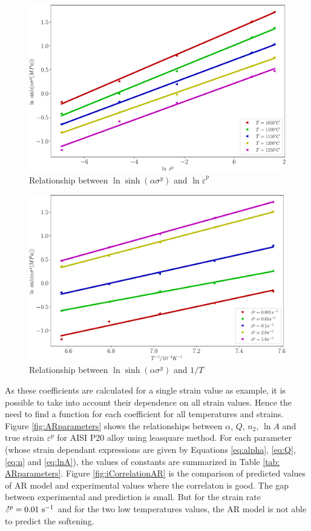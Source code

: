 \documentclass[twoside,english,1p,final,sort&compress]{elsarticle}
\theoremstyle{plain}
\newcommand{\mdot}[1]{\accentset{\mbox{\bfseries .}}{#1}}
\begin{document}
\begin{figure}[!ht]
\centering
\includegraphics[width=0.9\columnwidth]{Figures/LnSinhE}
\caption{Relationship between $\ln \sinh(\alpha\sigma^y) $ and $\ln \dot{\varepsilon}^p$}
\label{fig:LnSinhE}
\end{figure}
\begin{figure}[!ht]
\centering
\includegraphics[width=0.9\columnwidth]{Figures/LnSinhT}
\caption{Relationship between $\ln \sinh(\alpha\sigma^y) $ and $1/T$}
\label{fig:LnSinhT}
\end{figure}
As these coefficients are calculated for a single strain value as example, it is possible to take into account their dependence on all strain values. Hence the need to find a function for each coefficient for all temperatures and strains. Figure  \ref{fig:ARparameters} shows the relationships between $\alpha$, $Q$, $n_2$, $\ln A$ and true strain $\varepsilon^p$ for AISI P20 alloy using leasquare method. For each parameter (whose strain dependant expressions are given by Equations \ref{eq:alpha}, \ref{eq:Q}, \ref{eq:n} and \ref{eq:lnA}), the values of constants are summarized in Table \ref{tab: ARparameters}. Figure \ref{fig:iCorrelationAR} is the comparison of predicted values of AR model and experimental values where the correlaton is good. The gap between experimental and prediction is small. But for the strain rate $\mdot{\varepsilon}^p = 0.01\ \text{s}^{-1}$ and for the two low temperatures values, the AR model is not able to predict the softening.
\end{document}
